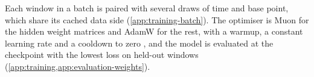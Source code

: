 Each window in a batch is paired with several draws of time and base point, which share its cached
data side (\cref{app:training-batch}). The optimiser is Muon \citep{jordan2024muon,liu2025muon} for the hidden weight matrices and
AdamW for the rest, with a warmup, a constant learning rate and a cooldown to zero
\citep{hagele2024scaling}, and the model is evaluated at the checkpoint with the lowest loss on
held-out windows (\cref{app:training,app:evaluation-weights}).
